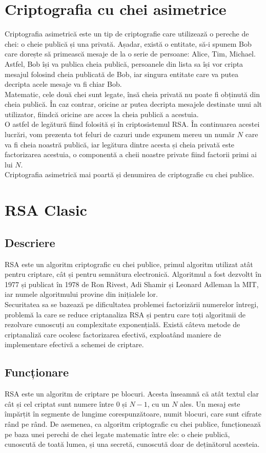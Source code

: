 \documentclass[12pt, oneside]{book}
\begin{document}
\section{Criptografia cu chei asimetrice}
Criptografia asimetrică este un tip de criptografie care utilizează o pereche de chei: o cheie publică și una privată. Așadar, există o entitate, să-i spunem Bob care dorește să primească mesaje de la o serie de persoane: Alice, Tim, Michael. Astfel, Bob își va publica cheia publică, persoanele din lista sa își vor cripta mesajul folosind cheia publicată de Bob, iar singura entitate care va putea decripta acele mesaje va fi chiar Bob. \\
Matematic, cele două chei sunt legate, însă cheia privată nu poate fi obținută din cheia publică. În caz contrar, oricine ar putea decripta mesajele destinate unui alt utilizator, fiindcă oricine are acces la cheia publică a acestuia. \\
O astfel de legătură fiind folosită și în criptosistemul RSA. În continuarea acestei lucrări, vom prezenta tot feluri de cazuri unde expunem mereu un număr $N$ care va fi cheia noastră publică, iar legătura dintre acesta și cheia privată este factorizarea acestuia, o componentă a cheii noastre private fiind factorii primi ai lui $N$. \\
Criptografia asimetrică mai poartă și denumirea de criptografie cu chei publice. 

\section{RSA Clasic}
\subsection{Descriere}
RSA este un algoritm criptografic cu chei publice, primul algoritm utilizat atât pentru criptare, cât și pentru semnătura electronică. Algoritmul a fost dezvoltt în 1977 și publicat în 1978 de Ron Rivest, Adi Shamir și Leonard Adleman la MIT, iar numele algoritmului provine din inițialele lor. \\
Securitatea sa se bazează pe dificultatea problemei factorizării numerelor întregi, problemă la care se reduce criptanaliza RSA și pentru care toți algoritmii de rezolvare cunoscuți au complexitate exponențială. Există câteva metode de criptanaliză care ocolesc factorizarea efectivă, exploatând maniere de implementare efectivă a schemei de criptare.
\subsection{Funcționare}
RSA este un algoritm de criptare pe blocuri. Acesta înseamnă că atât textul clar cât și cel criptat sunt numere între 0 și $N-1$, cu un $N$ ales. Un mesaj este împărțit în segmente de lungime corespunzătoare, numit blocuri, care sunt cifrate rând pe rând. De asemenea, ca algoritm criptografic cu chei publice, funcționează pe baza unei perechi de chei legate matematic între ele: o cheie publică, cunoscută de toată lumea, și una secretă, cunoscută doar de deținătorul acesteia.
\end{document}
